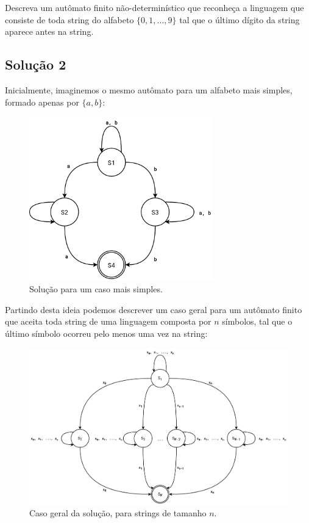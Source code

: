 \documentclass[a4paper, 12pt]{article}
\begin{document}
Descreva um autômato finito não-determinístico que reconheça a linguagem
que consiste de toda string do alfabeto $\{0, 1, ..., 9\}$ tal que o último dígito da
string aparece antes na string.

\subsection*{Solução 2}


Inicialmente, imaginemos o mesmo autômato para um alfabeto mais simples, formado apenas por $\{a, b\}$:

\begin{figure}[!ht]
    \centering
    \includegraphics[width=8cm]{./imgs/task-2-2a.pdf}
    \caption{Solução para um caso mais simples.}
    \label{fig:solution_t2_2a}
\end{figure}

Partindo desta ideia podemos descrever um caso geral para um autômato finito 
que aceita toda string de uma linguagem composta por $n$ símbolos, tal que o último
símbolo ocorreu pelo menos uma vez na string:

\begin{figure}[!ht]
    \centering
    \includegraphics[width=\linewidth]{./imgs/task-2-2b.pdf}
    \caption{Caso geral da solução, para strings de tamanho $n$.}
    \label{fig:solution_t2_2b}
\end{figure}
\end{document}
